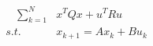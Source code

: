 \documentclass[preview]{standalone}
\begin{document}
\begin{align*}
\quad \sum_{k=1}^N &x^TQx + u^T R u \\ s.t. \quad &x_{k+1} = Ax_k + Bu_k
\end{align*}
\end{document}
